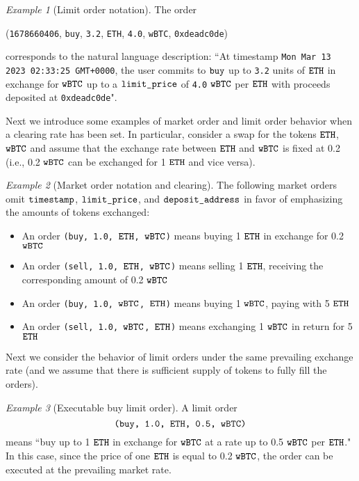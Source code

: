 \documentclass[11pt, reqno]{amsart}
\theoremstyle{definition}
\theoremstyle{remark}
\newtheorem{exmp}{Example}[subsection]
\newcommand{\BTC}{\textnormal{\texttt{wBTC}}}
\newcommand{\ETH}{\textnormal{\texttt{ETH}}}
\newcommand{\timestamp}{\textnormal{\texttt{timestamp}}}
\newcommand{\limitprice}{\textnormal{\texttt{limit\_price}}}
\newcommand{\depositaddress}{\textnormal{\texttt{deposit\_address}}}
\newcommand{\buy}{\textnormal{\texttt{buy}}}
\newcommand{\sell}{\textnormal{\texttt{sell}}}
\begin{document}
\begin{exmp}[Limit order notation]
The order
\begin{center}
    (\textnormal{\texttt{1678660406}},
    \buy,
    \textnormal{\texttt{3.2}},
    \ETH,
    \textnormal{\texttt{4.0}},
    \BTC,
    \textnormal{\texttt{0xdeadc0de}})
\end{center}
corresponds to the natural language description:
``At timestamp \textnormal{\texttt{Mon Mar 13 2023 02:33:25 GMT+0000}}, the user
commits to $\buy$ up to \textnormal{\texttt{3.2}} units of $\ETH$ in exchange
for $\BTC$ up to a $\limitprice$ of \textnormal{\texttt{4.0}} $\BTC$ per $\ETH$
with proceeds deposited at \textnormal{\texttt{0xdeadc0de}}".
\end{exmp}

Next we introduce some examples of market order and limit order behavior when
a clearing rate has been set.
In particular, consider a swap for the tokens $\ETH$, $\BTC$ and assume that
the exchange rate between $\ETH$ and $\BTC$ is fixed at 0.2 (i.e.,
0.2 $\BTC$ can be exchanged for 1 $\ETH$ and vice versa).

\begin{exmp}[Market order notation and clearing]
The following market orders omit $\timestamp$, $\limitprice$, and
$\depositaddress$ in favor of emphasizing the amounts of tokens exchanged:
\begin{itemize}
    \item An order \texttt{(\buy, 1.0, $\ETH$, $\BTC$)} means buying 1
          $\ETH$ in exchange for 0.2 $\BTC$
    \item An order \texttt{(\sell, 1.0, $\ETH$, $\BTC$)} means selling 1 $\ETH$,
          receiving the corresponding amount of 0.2 $\BTC$
    \item An order \texttt{(\buy, 1.0, $\BTC$, $\ETH$)} means buying 1 $\BTC$,
          paying with 5 $\ETH$
    \item An order \texttt{(\sell, 1.0, $\BTC$, $\ETH$)} means exchanging
          1 $\BTC$ in return for 5 $\ETH$
\end{itemize}
\end{exmp}

Next we consider the behavior of limit orders under the same prevailing exchange
rate (and we assume that there is sufficient supply of tokens to fully fill the
orders).

\begin{exmp}[Executable buy limit order]
A limit order
\[
    \texttt{(\buy, 1.0, $\ETH$, 0.5, $\BTC$)}
\]
means
``buy up to 1 $\ETH$ in exchange for $\BTC$ at a rate up to 0.5 $\BTC$ per $\ETH$."
In this case, since the price of one $\ETH$ is equal to 0.2 $\BTC$, the order
can be executed at the prevailing market rate.
\end{exmp}
\end{document}
